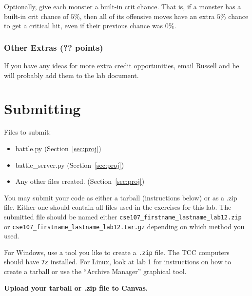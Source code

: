 \documentclass[11pt]{cselabheader}
\begin{document}
Optionally, give each monster a built-in crit chance. That is, if a monster
has a built-in crit chance of $5\%$, then all of its offensive moves have
an extra $5\%$ chance to get a critical hit, even if their previous chance
was 0\%.

\subsubsection{Other Extras (?? points)}
If you have any ideas for more extra credit opportunities, email Russell and he
will probably add them to the lab document.

\pagebreak
\section{Submitting}

Files to submit:
\begin{itemize}
\item battle.py (Section~\ref{sec:proj})
\item battle\_server.py (Section~\ref{sec:proj})
\item Any other files created. (Section~\ref{sec:proj})
\end{itemize}

You may submit your code as either a tarball (instructions below) or as a .zip
file. Either one should contain all files used in the exercises for this lab.
The submitted file should be named either
\texttt{cse107\_firstname\_lastname\_lab12.zip} or
\texttt{cse107\_firstname\_lastname\_lab12.tar.gz} depending on which method you
used.

For Windows, use a tool you like to create a \texttt{.zip} file. The TCC
computers should have \texttt{7z} installed. For Linux, look at lab 1 for
instructions on how to create a tarball or use the ``Archive Manager'' graphical
tool.

\begin{center}
  \textbf{Upload your tarball or .zip file to Canvas.}
\end{center}
\end{document}
